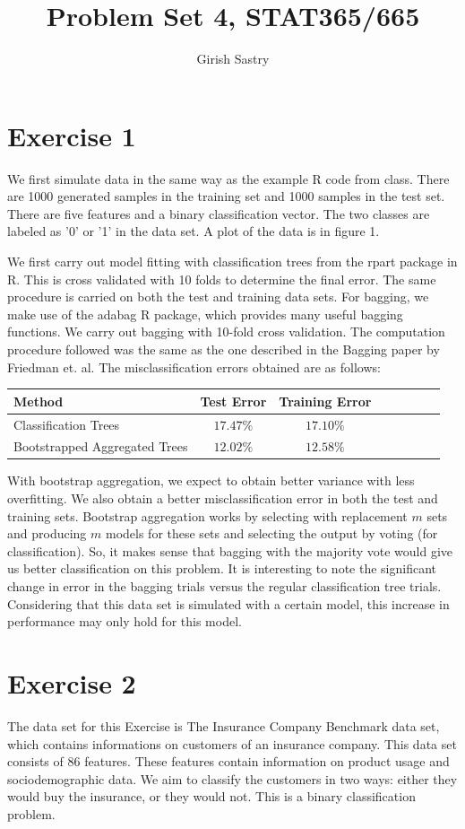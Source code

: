 \documentclass[a4paper,10pt]{article}
\title{Problem Set 4, STAT365/665}
\author{Girish Sastry}
\begin{document}
\maketitle

\section{Exercise 1}

We first simulate data in the same way as the example R code from class. There
are 1000 generated samples in the training set and 1000 samples in the test set.
There are five features and a binary classification vector. The two classes are
labeled as '0' or '1' in the data set. A plot of the data is in figure 1.

We first carry out model fitting with classification trees from the rpart
package in R. This is cross validated with 10 folds to determine the final error.
The same procedure is carried on both the test and training data sets. For
bagging, we make use of the adabag R package, which provides many useful bagging
functions. We carry out bagging with 10-fold cross validation. The computation
procedure followed was the same as the one described in the Bagging paper by
Friedman et. al. The misclassification errors obtained are as follows:

\begin{tabular}{l*{6}{c}r}
 Method		& Test Error & Training Error \\
 \hline
 Classification Trees	& $17.47\%$ & $17.10\%$ \\
 Bootstrapped Aggregated Trees 	& $12.02\%$ & $12.58\%$ \\
\end{tabular}

With bootstrap aggregation, we expect to obtain better variance with less overfitting.
We also obtain a better misclassification error in both the test and training
sets. Bootstrap aggregation works by selecting with replacement $m$ sets and producing
$m$ models for these sets and selecting the output by voting (for classification). 
So, it makes sense that bagging with the majority vote would give us better classification
on this problem. It is interesting to note the significant change in error in the bagging
trials versus the regular classification tree trials. Considering that this data set
is simulated with a certain model, this increase in performance may only hold for this 
model. 

\section{Exercise 2}
The data set for this Exercise is The Insurance Company Benchmark data set, which contains
informations on customers of an insurance company. This data set consists of 86 features.
These features contain information on product usage and sociodemographic data. We aim to 
classify the customers in two ways: either they would buy the insurance, or they would not.
This is a binary classification problem. 
\end{document}
